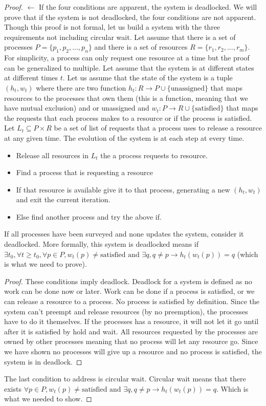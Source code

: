 \begin{proof}
$\leftarrow$ If the four conditions are apparent, the system is deadlocked. We will prove that if the system is not deadlocked, the four conditions are not apparent. Though this proof is not formal, let us build a system with the three requirements not including circular wait. Let assume that there is a set of processes $P = \{p_1, p_2, ..., p_n\}$ and there is a set of resources $R = \{r_1, r_2, ..., r_m\}$. For simplicity, a process can only request one resource at a time but the proof can be generalized to multiple. Let assume that the system is at different states at different times $t$. Let us assume that the state of the system is a tuple $(h_t, w_t)$ where there are two function $h_t: R \rightarrow P \cup \{\text{unassigned}\}$ that maps resources to the processes that own them (this is a function, meaning that we have mutual exclusion) and or unassigned and $w_t: P \rightarrow R \cup \{\text{satisfied}\}$ that maps the requests that each process makes to a resource or if the process is satisfied. Let $L_t \subseteq P \times R$ be a set of list of requests that a process uses to release a resource at any given time. The evolution of the system is at each step at every time.

\begin{itemize}
\item Release all resources in $L_t$ the a process requests to resource.
\item Find a process that is requesting a resource
\item If that resource is available give it to that process, generating a new $(h_t, w_t)$ and exit the current iteration.
\item Else find another process and try the above if.
\end{itemize}

If all processes have been surveyed and none updates the system, consider it deadlocked. More formally, this system is deadlocked means  if $\exists t_0, \forall t \geq t_0, \forall p \in P, w_t(p) \neq \text{satisfied} \text{ and } \exists q, q \neq p \rightarrow h_t(w_t(p)) = q$ (which is what we need to prove). 
\begin{proof} These conditions imply deadlock. 
Deadlock for a system is defined as no work can be done now or later. Work can be done if a process is satisfied, or we can release a resource to a process. No process is satisfied by definition. Since the system can't preempt and release resources (by no preemption), the processes have to do it themselves. If the processes has a resource, it will not let it go until after it is satisfied by hold and wait. All resources requested by the processes are owned by other processes meaning that no process will let any resource go. Since we have shown no processes will give up a resource and no process is satisfied, the system is in deadlock.
\end{proof}
The last condition to address is circular wait. Circular wait means that there exists $\forall p \in P, w_t(p) \neq \text{satisfied} \text{ and } \exists q, q \neq p \rightarrow h_t(w_t(p)) = q$. Which is what we needed to show.
\end{proof}

